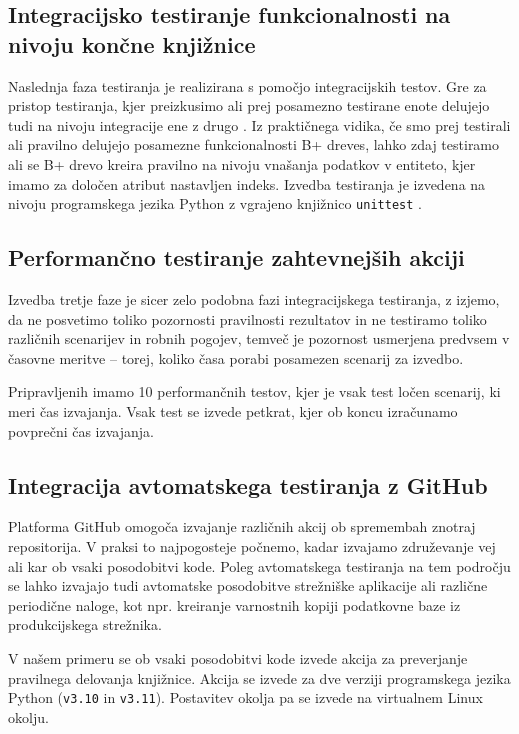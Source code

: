 \documentclass[a4paper,12pt,openright]{book}
\begin{document}
   \subsection{Integracijsko testiranje funkcionalnosti na nivoju končne knjižnice}

    Naslednja faza testiranja je realizirana s pomočjo integracijskih testov. Gre za pristop testiranja, kjer preizkusimo ali prej posamezno testirane enote delujejo tudi na nivoju integracije ene z drugo \cite{brar2015differentiating}. Iz praktičnega vidika, če smo prej testirali ali pravilno delujejo posamezne funkcionalnosti B+ dreves, lahko zdaj testiramo ali se B+ drevo kreira pravilno na nivoju vnašanja podatkov v entiteto, kjer imamo za določen atribut nastavljen indeks. Izvedba testiranja je izvedena na nivoju programskega jezika Python z vgrajeno knjižnico {\tt unittest} \cite{PY_UNITTEST}.
   
   \subsection{Performančno testiranje zahtevnejših akciji}

    Izvedba tretje faze je sicer zelo podobna fazi integracijskega testiranja, z izjemo, da ne posvetimo toliko pozornosti pravilnosti rezultatov in ne testiramo toliko različnih scenarijev in robnih pogojev, temveč je pozornost usmerjena predvsem v časovne meritve – torej, koliko časa porabi posamezen scenarij za izvedbo.

    Pripravljenih imamo 10 performančnih testov, kjer je vsak test ločen scenarij, ki meri čas izvajanja. Vsak test se izvede petkrat, kjer ob koncu izračunamo povprečni čas izvajanja.
   
   \subsection{Integracija avtomatskega testiranja z GitHub}

   Platforma GitHub omogoča izvajanje različnih akcij ob spremembah znotraj repositorija. V praksi to najpogosteje počnemo, kadar izvajamo združevanje vej ali kar ob vsaki posodobitvi kode. Poleg avtomatskega testiranja na tem področju se lahko izvajajo tudi avtomatske posodobitve strežniške aplikacije ali različne periodične naloge, kot npr. kreiranje varnostnih kopiji podatkovne baze iz produkcijskega strežnika.

   V našem primeru se ob vsaki posodobitvi kode izvede akcija za preverjanje pravilnega delovanja knjižnice. Akcija se izvede za dve verziji programskega jezika Python ({\tt v3.10} in {\tt v3.11}). Postavitev okolja pa se izvede na virtualnem Linux okolju.
\end{document}
